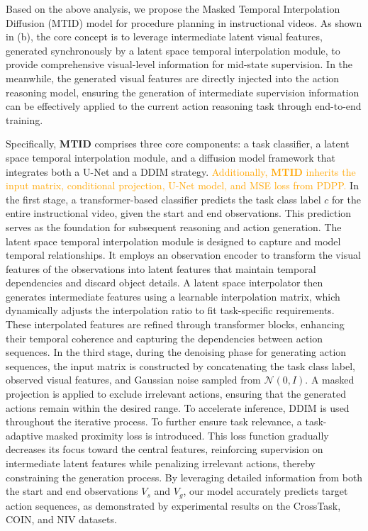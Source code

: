 

Based on the above analysis, we propose the Masked Temporal Interpolation Diffusion (MTID) model for procedure planning in instructional videos. 
As shown in (b), the core concept is to leverage intermediate latent visual features, generated synchronously by a latent space temporal interpolation module, to provide comprehensive visual-level information for mid-state supervision. 
In the meanwhile, the generated visual features are directly injected into the action reasoning model, ensuring the generation of intermediate supervision information can be effectively applied to the current action reasoning task through end-to-end training.

Specifically, \textbf{MTID} comprises three core components: a task classifier, a latent space temporal interpolation module, and a diffusion model framework that integrates both a U-Net and a DDIM strategy. \textcolor{orange}{Additionally, \textbf{MTID} inherits the input matrix, conditional projection, U-Net model, and MSE loss from PDPP.}
In the first stage, a transformer-based classifier predicts the task class label $c$ for the entire instructional video, given the start and end observations. This prediction serves as the foundation for subsequent reasoning and action generation.
The latent space temporal interpolation module is designed to capture and model temporal relationships. 
It employs an observation encoder to transform the visual features of the observations into latent features that maintain temporal dependencies and discard object details. 
A latent space interpolator then generates intermediate features using a learnable interpolation matrix, which dynamically adjusts the interpolation ratio to fit task-specific requirements. 
These interpolated features are refined through transformer blocks, enhancing their temporal coherence and capturing the dependencies between action sequences.
In the third stage, during the denoising phase for generating action sequences, the input matrix is constructed by concatenating the task class label, observed visual features, and Gaussian noise sampled from $\mathcal{N}(0, I)$. 
A masked projection is applied to exclude irrelevant actions, ensuring that the generated actions remain within the desired range. 
To accelerate inference, DDIM is used throughout the iterative process.
To further ensure task relevance, a task-adaptive masked proximity loss is introduced. This loss function gradually decreases its focus toward the central features, reinforcing supervision on intermediate latent features while penalizing irrelevant actions, thereby constraining the generation process. 
By leveraging detailed information from both the start and end observations $V_s$ and $V_g$, our model accurately predicts target action sequences, as demonstrated by experimental results on the CrossTask, COIN, and NIV datasets.

